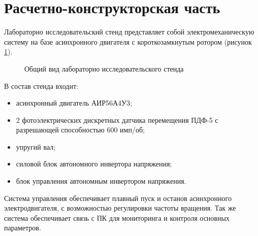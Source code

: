 \section{Расчетно-конструкторская часть}
        
        Лабораторно исследовательский стенд  представляет собой
        электромеханическую систему на базе асинхронного двигателя с
        короткозамкнутым ротором (рисунок \ref{fig:general-view}).

        \begin{figure}[h!]
            \caption{Общий вид лабораторно исследовательского стенда}
            \label{fig:general-view}
        \end{figure}
        
        В состав стенда входит:
        \begin{itemize}
            \item асинхронный двигатель АИР56А4У3;
            \item 2 фотоэлектрических дискретных датчика перемещения ПДФ-5 с
            разрешающей способностью  600 имп/об;
            \item упругий вал;
            \item силовой блок автономного инвертора напряжения;
            \item блок управления автономным инвертором напряжения.
        \end{itemize}

        Система управления обеспечивает плавный пуск и останов асинхронного
        электродвигателя, с возможностью регулировки частоты вращения. Так же
        система обеспечивает связь с ПК для мониторинга и контроля основных
        параметров.
          

